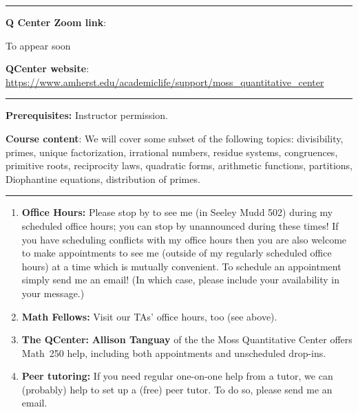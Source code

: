 \documentclass[12pt]{article}
\begin{document}



          
\smallskip \hrule \medskip          
\noindent\textbf{Q Center Zoom link}:
\begin{center}
    {\color{red}To appear soon}   %
\end{center}


\noindent\textbf{QCenter website}: \url{https://www.amherst.edu/academiclife/support/moss_quantitative_center}

\medskip \hrule \medskip

\noindent\textbf{Prerequisites:} Instructor permission.
\smallskip

\noindent \textbf{Course content}: We will cover some subset of the following topics: divisibility, primes, unique factorization, irrational numbers, residue systems, congruences, primitive roots, reciprocity laws, quadratic forms, arithmetic functions, partitions, Diophantine equations, distribution of primes.

\smallskip \hrule \medskip
{}
\begin{enumerate}
\item[]{\bf Office Hours:} Please stop by to see me (in Seeley Mudd 502) during my scheduled office hours; you can stop by unannounced during these times! If you have scheduling conflicts with my office hours then you are also welcome to make appointments to see me (outside of my regularly scheduled office hours) at a time which is mutually convenient. To schedule an appointment simply send me an email! (In which case, please include your availability in your message.)
\item[] {\bf Math Fellows:} Visit our TAs' office hours, too (see above).
\item[] {\bf The QCenter:} \textbf{Allison Tanguay} of the the Moss Quantitative Center offers Math~250 help, including both appointments and unscheduled drop-ins.
\item[] {\bf Peer tutoring:} If you need regular one-on-one help from a tutor, we can (probably) help to set up a (free) peer tutor. To do so, please send me an email.
\end{enumerate}
\end{document}
